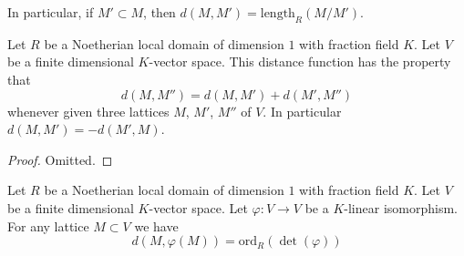 \noindent
In particular, if $M' \subset M$, then
$d(M, M') = \text{length}_R(M/M')$.

\begin{lemma}
\label{lemma-properties-distance-function}
Let $R$ be a Noetherian local domain of dimension $1$ with
fraction field $K$. Let $V$ be a finite dimensional $K$-vector space.
This distance function has the property that
$$
d(M, M'') = d(M, M') + d(M', M'')
$$
whenever given three lattices $M$, $M'$, $M''$ of $V$.
In particular $d(M, M') = - d(M', M)$.
\end{lemma}

\begin{proof}
Omitted.
\end{proof}

\begin{lemma}
\label{lemma-order-vanishing-determinant}
Let $R$ be a Noetherian local domain of dimension $1$ with
fraction field $K$. Let $V$ be a finite dimensional $K$-vector space.
Let $\varphi : V \to V$ be a $K$-linear isomorphism.
For any lattice $M \subset V$ we have
$$
d(M, \varphi(M)) = \text{ord}_R(\det(\varphi))
$$
\end{lemma}


